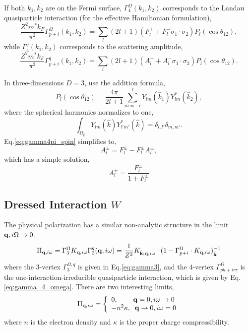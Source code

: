 \documentclass[reprint,amsmath,amssymb,aps,prb]{revtex4-1}
\begin{document}
If both $k_1, k_2$ are on the Fermi surface, $\Gamma_4^\Omega (k_1, k_2)$ corresponds to the Landau quasiparticle interaction (for the effective Hamiltonian formulation),
\begin{equation}
    \label{eq:F}
    \frac{Z^2 m^* k_F}{\pi^2}\Gamma_{p+i}^\Omega (k_1, k_2)=\sum_l (2l+1)(F_l^++F_l^-\sigma_1\cdot\sigma_2) P_l(\cos\theta_{12}),
\end{equation}
while $\Gamma_4^q (k_1, k_2)$ corresponds to the scattering amplitude,
\begin{equation}
    \frac{Z^2 m^* k_F}{\pi^2}\Gamma_{p+i}^q (k_1, k_2)=\sum_l (2l+1)(A_l^++A_l^-\sigma_1\cdot\sigma_2) P_l(\cos\theta_{12}).
\end{equation}

In three-dimensions $D=3$, use the addition formula,
\begin{equation}
    P_l(\cos\theta_{12})=\frac{4\pi}{2l+1} \sum_{m=-l}^{l} Y_{lm}(\hat{k}_1) Y^*_{lm}(\hat{k}_2),
\end{equation}
where the spherical harmonics normalizes to one,
\begin{equation}
    \int_{\Omega_{\hat{k}}}  Y_{lm}(\hat{k}) Y^*_{l'm'}(\hat{k})=\delta_{l,l'}\delta_{m, m'}.
\end{equation}
Eq.\eqref{eq:gamma4pi_spin} simplifies to,
\begin{equation}
    A_l^\pm=F_l^\pm-F_l^{\pm}A_l^\pm,
\end{equation}
which has a simple solution,
\begin{equation}
    A_l^\pm=\frac{F_l^\pm}{1+F_l^\pm}
\end{equation}

\subsection{Dressed Interaction $W$}

The physical polarization has a similar non-analytic structure in the limit $\mathbf{q}, i\Omega \rightarrow 0$,
\begin{equation}
    \label{eq:polar}
    \Pi_{\mathbf{q}, i\omega}=\Gamma_3^{\Omega}K_{\mathbf{q}, i\omega} \Gamma_3^q(\mathbf{q}, i\omega)=\frac{1}{Z^2}K_{\hat{\mathbf{k}}; \mathbf{q}, i\omega}\cdot(1-\Gamma_{p+i}^\Omega \cdot K_{\mathbf{q}, i\omega})^{-1}_{\hat{\mathbf{k}}}
\end{equation}
where the $3$-vertex $\Gamma_3^{\Omega, q}$ is given in Eq.\eqref{eq:gamma3}, and the $4$-vertex $\Gamma^{\Omega}_{ph+irr}$ is the one-interaction-irreducible quasiparticle interaction, which is given by Eq.\ref{eq:gamma_4_omega}. There are two interesting limits,
\begin{equation}
    \Pi_{\mathbf{q}, i\omega}=\left\{
    \begin{array}{ll}
        0, \;\;\;\;\;\;\;\; \mathbf{q}=0, i\omega \rightarrow 0 \\
        -n^2\kappa, \;\; \mathbf{q}\rightarrow 0, i\omega=0
    \end{array}
    \right.
\end{equation}
where $n$ is the electron density and $\kappa$ is the proper charge compressibility.
\end{document}
